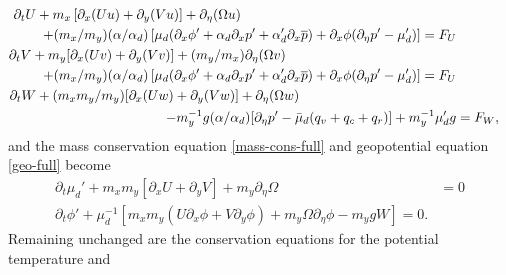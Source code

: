 \begin{align}
\partial_t U + m_x\left[\partial_x(Uu) + \partial_y(Vu)\right] + \partial_\eta (\Omega u) ~~~~~~~~ ~~~~~~~~ ~~~~~~~~ ~~~~~~~~ ~~~~~~~ ~~~~~~~ ~~ \notag &
\hphantom{(m_y/m_x)}
\\
+(m_x/m_y) (\alpha/\alpha_d) \left[ \mu_d (\partial_x \phi' + \alpha_d \partial_x p' + \alpha'_d \partial_x \overline{p}) +
\partial_x \phi (\partial_\eta p' - \mu'_d)\right]  = F_U
\label{u-mom-pert}
\\
%
\partial_t V + m_y[\partial_x (Uv) + \partial_y (Vv)] + (m_y/m_x) \partial_\eta (\Omega v) ~~~~~~~~ ~~~~~~~~ ~~~~~~~~ ~~~~~~~~ ~~~~~~ \notag &
\\
+(m_x/m_y) (\alpha/\alpha_d) \left[ \mu_d (\partial_x \phi' + \alpha_d \partial_x p' + \alpha'_d \partial_x \overline{p}) +
\partial_x \phi (\partial_\eta p' - \mu'_d)\right]  = F_U
\\
%
\partial_t W  + (m_x m_y/m_y) [\partial_x (Uw) + \partial_y (Vw)] + \partial_\eta
(\Omega w)  ~~~~~~~~ ~~~~~~~~ ~~~~~~~~ ~~~~~~~~ ~~~ \notag & 
\\
- m_y^{-1} g (\alpha/\alpha_d) [\partial_\eta p' 
- {\bar{\mu}}_d (q_v + q_c +q_r)]
+ m_y^{-1} {\mu}_d'g
&= F_W,
\label{w-mom-pert}
\end{align}
%
and the mass conservation equation \eqref{mass-cons-full}
and geopotential equation \eqref{geo-full} become
%
\begin{align}
\partial_t  \mu_d' + m_x m_y[\partial_x U + \partial_y V] + m_y
\partial_\eta \Omega
& = 0 \\
%
\partial_t \phi' 
+ \mu_d^{-1}
[m_x m_y (U\partial_x\phi + V\partial_y\phi) + m_y
\Omega\partial_\eta\phi -m_y gW ] = 0.
%
\end{align}
%
\noindent
Remaining unchanged are
the conservation equations for the potential temperature and 
